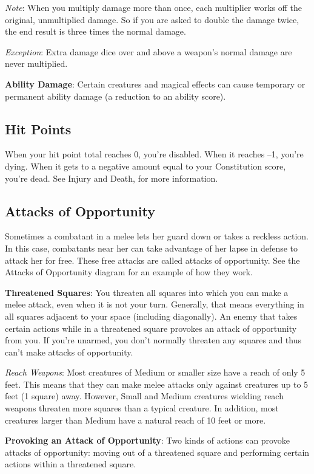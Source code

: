 \textit{Note}: When you multiply damage more than once, each multiplier works off the original, unmultiplied damage. So if you are asked to double the damage twice, the end result is three times the normal damage.
				
\textit{Exception}: Extra damage dice over and above a weapon's normal damage are never multiplied.
				
\textbf{Ability Damage}: Certain creatures and magical effects can cause temporary or permanent ability damage (a reduction to an ability score).
				
\subsection{Hit Points}

				
When your hit point total reaches 0, you're disabled. When it reaches --1, you're dying. When it gets to a negative amount equal to your Constitution score, you're dead. See Injury and Death, for more information.
				
\subsection{Attacks of Opportunity}

				
Sometimes a combatant in a melee lets her guard down or takes a reckless action. In this case, combatants near her can take advantage of her lapse in defense to attack her for free. These free attacks are called attacks of opportunity. See the Attacks of Opportunity diagram for an example of how they work.
				
\textbf{Threatened Squares}: You threaten all squares into which you can make a melee attack, even when it is not your turn. Generally, that means everything in all squares adjacent to your space (including diagonally). An enemy that takes certain actions while in a threatened square provokes an attack of opportunity from you. If you're unarmed, you don't normally threaten any squares and thus can't make attacks of opportunity.
				
\textit{Reach Weapons}: Most creatures of Medium or smaller size have a reach of only 5 feet. This means that they can make melee attacks only against creatures up to 5 feet (1 square) away. However, Small and Medium creatures wielding reach weapons threaten more squares than a typical creature. In addition, most creatures larger than Medium have a natural reach of 10 feet or more.
				
\textbf{Provoking an Attack of Opportunity}: Two kinds of actions can provoke attacks of opportunity: moving out of a threatened square and performing certain actions within a threatened square.
				
